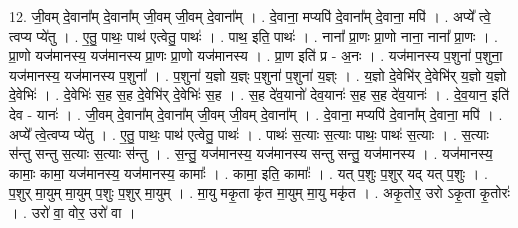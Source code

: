 \documentclass[17pt]{extarticle}
\begin{document}
12. जी॒वम् दे॒वाना᳚म् दे॒वाना᳚म् जी॒वम् जी॒वम् दे॒वाना᳚म् । . दे॒वाना॒ मप्यपि॑ दे॒वाना᳚म् दे॒वाना॒ मपि॑ । . अप्ये᳚ त्वे॒ त्वप्य प्ये॑तु । . ए॒तु॒ पाथः॒ पाथ॑ एत्वेतु॒ पाथः॑ । . पाथ॒ इति॒ पाथः॑ । . नाना᳚ प्रा॒णः प्रा॒णो नाना॒ नाना᳚ प्रा॒णः । . प्रा॒णो यज॑मानस्य॒ यज॑मानस्य प्रा॒णः प्रा॒णो यज॑मानस्य । . प्रा॒ण इति॑ प्र - अ॒नः । . यज॑मानस्य प॒शुना॑ प॒शुना॒ यज॑मानस्य॒ यज॑मानस्य प॒शुना᳚ । . प॒शुना॑ य॒ज्ञो य॒ज्ञ्ः प॒शुना॑ प॒शुना॑ य॒ज्ञ्ः । . य॒ज्ञो दे॒वेभि॑र् दे॒वेभि॑र् य॒ज्ञो य॒ज्ञो दे॒वेभिः॑ । . दे॒वेभिः॑ स॒ह स॒ह दे॒वेभि॑र् दे॒वेभिः॑ स॒ह । . स॒ह दे॑व॒यानो॑ देव॒यानः॑ स॒ह स॒ह दे॑व॒यानः॑ । . दे॒व॒यान॒ इति॑ देव - यानः॑ । . जी॒वम् दे॒वाना᳚म् दे॒वाना᳚म् जी॒वम् जी॒वम् दे॒वाना᳚म् । . दे॒वाना॒ मप्यपि॑ दे॒वाना᳚म् दे॒वाना॒ मपि॑ । . अप्ये᳚ त्वे॒त्वप्य प्ये॑तु । . ए॒तु॒ पाथः॒ पाथ॑ एत्वेतु॒ पाथः॑ । . पाथः॑ स॒त्याः स॒त्याः पाथः॒ पाथः॑ स॒त्याः । . स॒त्याः स॑न्तु सन्तु स॒त्याः स॒त्याः स॑न्तु । . स॒न्तु॒ यज॑मानस्य॒ यज॑मानस्य सन्तु सन्तु॒ यज॑मानस्य । . यज॑मानस्य॒ कामाः॒ कामा॒ यज॑मानस्य॒ यज॑मानस्य॒ कामाः᳚ । . कामा॒ इति॒ कामाः᳚ । . यत् प॒शुः प॒शुर् यद् यत् प॒शुः । . प॒शुर् मा॒युम् मा॒युम् प॒शुः प॒शुर् मा॒युम् । . मा॒यु मकृ॒ता कृ॑त मा॒युम् मा॒यु मकृ॑त । . अकृ॒तोर॒ उरो ऽकृ॒ता कृ॒तोरः॑ । . उरो॑ वा॒ वोर॒ उरो॑ वा । \newline
\end{document}
